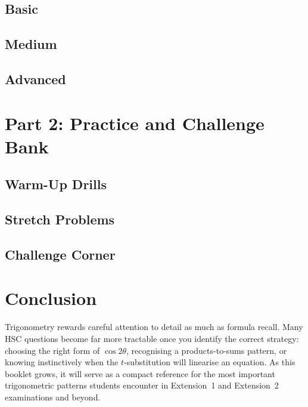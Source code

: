 \documentclass[12pt]{article}
\begin{document}
\subsection{Basic}


\subsection{Medium}


\subsection{Advanced}


\section{Part 2: Practice and Challenge Bank}

\subsection{Warm-Up Drills}


\subsection{Stretch Problems}


\subsection{Challenge Corner}


\section{Conclusion}

Trigonometry rewards careful attention to detail as much as formula recall. Many HSC questions become far more tractable once you identify the correct strategy: choosing the right form of $\cos 2\theta$, recognising a products-to-sums pattern, or knowing instinctively when the $t$-substitution will linearise an equation. As this booklet grows, it will serve as a compact reference for the most important trigonometric patterns students encounter in Extension~1 and Extension~2 examinations and beyond.
\end{document}
